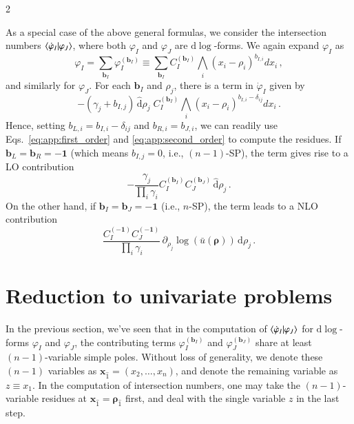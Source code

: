 \documentclass[fleqn]{2023SCGE}
\newcommand{\nd}{\mathrm{d}}
\newcommand{\nds}{\hat{\mathrm{d}}}
\begin{document}
\begin{multicols}{2}
\begin{appendix}
As a special case of the above general formulas, we consider the intersection numbers $\braket{\dot{\varphi}_I | \varphi_J}$, where both $\varphi_I$ and $\varphi_J$ are $\nd\log$-forms. We again expand $\varphi_I$ as
\begin{equation}
\varphi_I = \sum_{\bm{b}_I} \varphi_I^{(\bm{b}_I)} \equiv \sum_{\bm{b}_I} C_I^{(\bm{b}_I)} \bigwedge_i \left( x_i - \rho_i \right)^{b_{I,i}} dx_i \, ,
\end{equation}
and similarly for $\varphi_J$. For each $\bm{b}_I$ and $\rho_j$, there is a term in $\dot{\varphi}_I$ given by
\begin{equation}
-(\gamma_j + b_{I,j}) \, \nds\rho_j \; C_I^{(\bm{b}_I)} \bigwedge_i \left( x_i - \rho_i \right)^{b_{I,i}-\delta_{ij}} dx_i \,.
\label{eq:dot_phiI}
\end{equation}
Hence, setting $b_{L,i}=b_{I,i}-\delta_{ij}$ and $b_{R,i}=b_{J,i}$, we can readily use Eqs.~\eqref{eq:app:first_order} and \eqref{eq:app:second_order} to compute the residues. If $\bm{b}_L = \bm{b}_R = \bm{-1}$ (which means $b_{I,j}=0$, i.e., $(n-1)$-SP), the term gives rise to a LO contribution
\begin{equation}
    -\frac{\gamma_j}{\prod_i \gamma_i} C_I^{(\bm{b}_I)}C_J^{(\bm{b}_J)} \, \nds \rho_j \,.
\end{equation}
On the other hand, if $\bm{b}_I = \bm{b}_J = \bm{-1}$ (i.e., $n$-SP), the term leads to a NLO contribution
\begin{equation}
	\frac{C_I^{(\bm{-1})} C_J^{(\bm{-1})}}{\prod_i \gamma_i} \, \partial_{\rho_j} \log(\bar{u}(\bm{\rho})) \, \nds\rho_j \,.  
\end{equation}


\section{Reduction to univariate problems} \label{app2}

In the previous section, we've seen that in the computation of $\braket{\dot{\varphi}_I | \varphi_J}$ for $\nd\log$-forms $\varphi_I$ and $\varphi_J$, the contributing terms $\varphi_I^{(\bm{b}_I)}$ and $\varphi_J^{(\bm{b}_J)}$ share at least $(n-1)$-variable simple poles. Without loss of generality, we denote these $(n-1)$ variables as $\bm{x}_{\hat{1}} = (x_2,\ldots,x_{n})$, and denote the remaining variable as $z \equiv x_1$. In the computation of intersection numbers, one may take the $(n-1)$-variable residues at $\bm{x}_{\hat{1}} = \bm{\rho}_{\hat{1}}$ first, and deal with the single variable $z$ in the last step.


\end{appendix}
\end{multicols}
\end{document}
